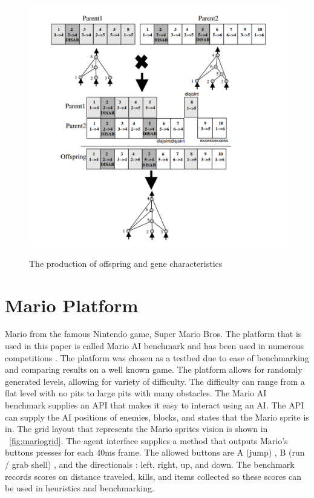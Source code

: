 \documentclass[12pt]{ucthesis} \newif\ifpdf \ifx\pdfoutput\undefined
\begin{document}
\begin{figure}[h!] 
\caption{The production of offspring and gene characteristics
\cite{stanley:phd04}}
  \centering
    \includegraphics[width=1\textwidth]{parentgenes.png}
   \label{fig:parentgenes}
\end{figure}


\section{Mario Platform}
Mario from the famous Nintendo game, Super Mario Bros. The platform
that is used in this paper is called Mario AI benchmark and has been used in
numerous competitions \cite{karakovskiy2012mario}. The platform was chosen as a
testbed due to ease of benchmarking and comparing results on a well
known game. The platform allows for randomly generated levels, allowing for
variety of difficulty. The difficulty can range from a flat level with no pits to large
pits with many obstacles. The Mario AI benchmark supplies an API that makes it
easy to interact using an AI. The API can supply the AI positions of enemies, blocks, and states
that the Mario sprite is in. The grid layout that represents the Mario sprites
vision is shown in ~\ref{fig:mariogrid}. The agent interface supplies a method
that outputs Mario’s buttons presses for each 40ms frame. The allowed buttons
are A (jump) , B (run / grab shell) , and the directionals : left, right, up,
and down. The benchmark records scores on distance traveled, kills, and items
collected so these scores can be used in heuristics and benchmarking.
\end{document}

